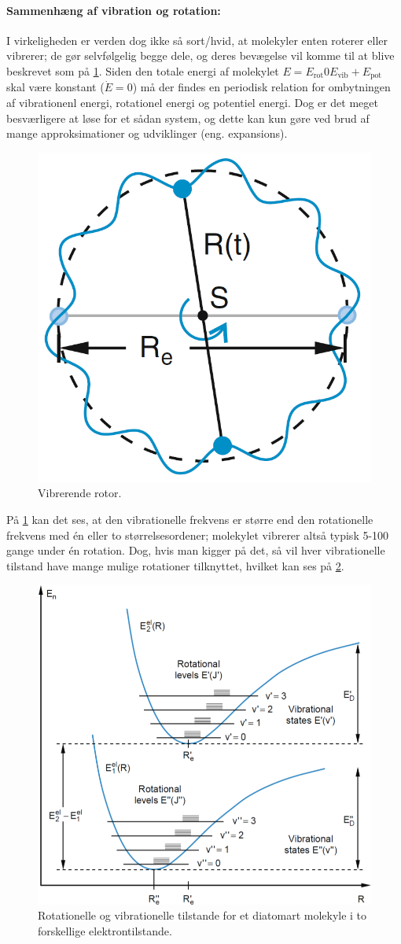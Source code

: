\paragraph{Sammenhæng af vibration og rotation:} I virkeligheden er verden dog ikke så sort/hvid, at molekyler enten roterer eller vibrerer; de gør selvfølgelig begge dele, og deres bevægelse vil komme til at blive beskrevet som på \cref{fig:Q20_VibratingRotor}. Siden den totale energi af molekylet $E = E_\text{rot} 0 E_\text{vib} + E_\text{pot}$ skal være konstant ($\Dot{E} = 0$) må der findes en periodisk relation for ombytningen af vibrationenl energi, rotationel energi og potentiel energi. Dog er det meget besværligere at løse for et sådan system, og dette kan kun gøre ved brud af mange approksimationer og udviklinger (eng. expansions).

\begin{figure}[!h]
    \centering
    \includegraphics[width=.35\textwidth]{Q20/images/VibratingRotor.PNG}
    \caption{Vibrerende rotor.}
    \label{fig:Q20_VibratingRotor}
\end{figure}

På \cref{fig:Q20_VibratingRotor} kan det ses, at den vibrationelle frekvens er større end den rotationelle frekvens med én eller to størrelsesordener; molekylet vibrerer altså typisk 5-100 gange under én rotation. Dog, hvis man kigger på det, så vil hver vibrationelle tilstand have mange mulige rotationer tilknyttet, hvilket kan ses på \cref{fig:Q20_VibrationOgRotationPotential}.

\begin{figure}[!h]
    \centering
    \includegraphics[width=.8\textwidth]{Q20/images/VibrationOgRotationIPotentialDiatomartMolekyle.PNG}
    \caption{Rotationelle og vibrationelle tilstande for et diatomart molekyle i to forskellige elektrontilstande.}
    \label{fig:Q20_VibrationOgRotationPotential}
\end{figure}
